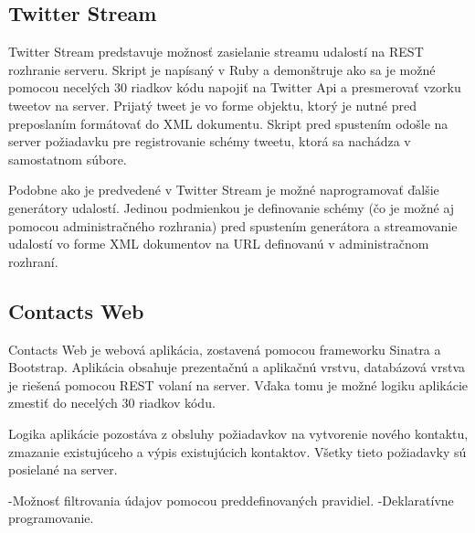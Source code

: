 	\subsection{Twitter Stream}
	Twitter Stream predstavuje možnosť zasielanie streamu udalostí na REST rozhranie serveru. Skript je napísaný v Ruby a demonštruje ako sa je možné pomocou necelých 30 riadkov kódu napojiť na Twitter Api a presmerovať vzorku tweetov na server. Prijatý tweet je vo forme objektu, ktorý je nutné pred preposlaním formátovať do XML dokumentu. Skript pred spustením odošle na server požiadavku pre registrovanie schémy tweetu, ktorá sa nachádza v samostatnom súbore.
	
	Podobne ako je predvedené v Twitter Stream je možné naprogramovať ďalšie generátory udalostí. Jedinou podmienkou je definovanie schémy (čo je možné aj pomocou administračného rozhrania) pred spustením generátora a streamovanie udalostí vo forme XML dokumentov na URL definovanú v administračnom rozhraní.
	
	\subsection{Contacts Web}
	Contacts Web je webová aplikácia, zostavená pomocou frameworku Sinatra a Bootstrap. Aplikácia obsahuje prezentačnú a aplikačnú vrstvu, databázová vrstva je riešená pomocou REST volaní na server. Vďaka tomu je možné logiku aplikácie zmestiť do necelých 30 riadkov kódu.
	
	Logika aplikácie pozostáva z obsluhy požiadavkov na vytvorenie nového kontaktu, zmazanie existujúceho a výpis existujúcich kontaktov. Všetky tieto požiadavky sú posielané na server.
	
	-Možnosť filtrovania údajov pomocou preddefinovaných pravidiel.
	-Deklaratívne programovanie.
	